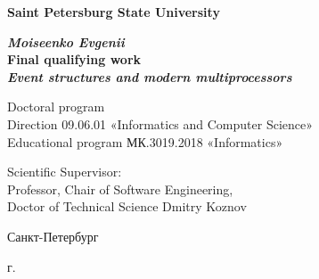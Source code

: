 

\begin{titlepage}
\begin{center}

\textbf{Saint Petersburg State University}

\vspace{35mm}

\textbf{\textit{\large Moiseenko Evgenii}} \\[8mm]
\textbf{\large Final qualifying work}\\[3mm]
\textbf{\textit{\large Event structures and modern multiprocessors}}

\vspace{20mm}
Doctoral program \\
Direction 09.06.01 «Informatics and Computer Science»\\
Educational program МК.3019.2018 «Informatics»\\


\begin{flushright}
\begin{minipage}[t]{0.7\textwidth}
{Scientific Supervisor:} \\
Professor, Chair of Software Engineering, \\ Doctor of Technical Science Dmitry Koznov

\vspace{10mm}

\end{minipage}
\end{flushright}

\vfill 

{Санкт-Петербург}
\par{\the\year{} г.}
\end{center}
\end{titlepage}
\restoregeometry
\addtocounter{page}{1}

